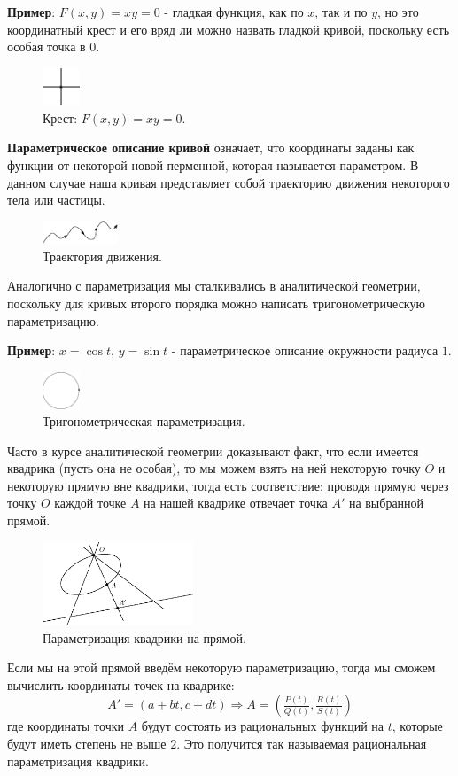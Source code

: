 \documentclass[12pt]{article}
\theoremstyle{definition}
\begin{document}
\textbf{Пример}: $F(x,y) = xy = 0$ - гладкая функция, как по $x$, так и по $y$, но это координатный крест и его вряд ли можно назвать гладкой кривой, поскольку есть особая точка в $0$.
\begin{figure}[H]
	\centering
	\includegraphics[width=0.1\textwidth]{CDGL1_2.eps}
	\caption{Крест: $F(x,y) = xy = 0$.}
	\label{1_2}
\end{figure}
\textbf{Параметрическое описание кривой} означает, что координаты заданы как функции от некоторой новой перменной, которая называется параметром. В данном случае наша кривая представляет собой траекторию движения некоторого тела или частицы. 
\begin{figure}[H]
	\centering
	\includegraphics[width=0.2\textwidth]{CDGL1_3.eps}
	\caption{Траектория движения.}
	\label{1_3}
\end{figure}

Аналогично с параметризация мы сталкивались в аналитической геометрии, поскольку для кривых второго порядка можно написать тригонометрическую параметризацию.

\textbf{Пример}: $x = \cos{t}, \, y = \sin{t}$ - параметрическое описание окружности радиуса $1$.
\begin{figure}[H]
	\centering
	\includegraphics[width=0.1\textwidth]{CDGL1_4.eps}
	\caption{Тригонометрическая параметризация.}
	\label{1_4}
\end{figure}

Часто в курсе аналитической геометрии доказывают факт, что если имеется квадрика (пусть она не особая), то мы можем взять на ней некоторую точку $O$ и некоторую прямую вне квадрики, тогда есть соответствие: проводя прямую через точку $O$ каждой точке $A$ на нашей квадрике отвечает точка $A'$ на выбранной прямой.
\begin{figure}[H]
	\centering
	\includegraphics[width=0.4\textwidth]{CDGL1_5.eps}
	\caption{Параметризация квадрики на прямой.}
	\label{1_5}
\end{figure} 
Если мы на этой прямой введём некоторую параметризацию, тогда мы сможем вычислить координаты точек на квадрике:
$$
	A' = (a + bt, c + dt) \Rightarrow A = \left(\tfrac{P(t)}{Q(t)},\tfrac{R(t)}{S(t)}\right)
$$
где координаты точки $A$ будут состоять из рациональных функций на $t$, которые будут иметь степень не выше $2$. Это получится так называемая рациональная параметризация квадрики.
\end{document}
